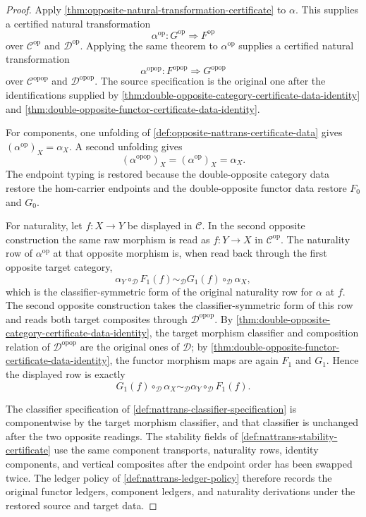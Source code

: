 \begin{proof}
Apply \autoref{thm:opposite-natural-transformation-certificate} to $\alpha$. This supplies a certified natural transformation
$$
\alpha^{\mathrm{op}}:G^{\mathrm{op}}\Rightarrow F^{\mathrm{op}}
$$
over $\mathcal C^{\mathrm{op}}$ and $\mathcal D^{\mathrm{op}}$. Applying the same theorem to $\alpha^{\mathrm{op}}$ supplies a certified natural transformation
$$
\alpha^{\mathrm{opop}}:F^{\mathrm{opop}}\Rightarrow G^{\mathrm{opop}}
$$
over $\mathcal C^{\mathrm{opop}}$ and $\mathcal D^{\mathrm{opop}}$. The source specification is the original one after the identifications supplied by \autoref{thm:double-opposite-category-certificate-data-identity} and \autoref{thm:double-opposite-functor-certificate-data-identity}.

For components, one unfolding of \autoref{def:opposite-nattrans-certificate-data} gives $(\alpha^{\mathrm{op}})_X=\alpha_X$. A second unfolding gives
$$
(\alpha^{\mathrm{opop}})_X=(\alpha^{\mathrm{op}})_X=\alpha_X.
$$
The endpoint typing is restored because the double-opposite category data restore the hom-carrier endpoints and the double-opposite functor data restore $F_0$ and $G_0$.

For naturality, let $f:X\to Y$ be displayed in $\mathcal C$. In the second opposite construction the same raw morphism is read as $f:Y\to X$ in $\mathcal C^{\mathrm{op}}$. The naturality row of $\alpha^{\mathrm{op}}$ at that opposite morphism is, when read back through the first opposite target category,
$$
\alpha_Y\circ_{\mathcal D}F_1(f)
\sim_{\mathcal D}
G_1(f)\circ_{\mathcal D}\alpha_X,
$$
which is the classifier-symmetric form of the original naturality row for $\alpha$ at $f$. The second opposite construction takes the classifier-symmetric form of this row and reads both target composites through $\mathcal D^{\mathrm{opop}}$. By \autoref{thm:double-opposite-category-certificate-data-identity}, the target morphism classifier and composition relation of $\mathcal D^{\mathrm{opop}}$ are the original ones of $\mathcal D$; by \autoref{thm:double-opposite-functor-certificate-data-identity}, the functor morphism maps are again $F_1$ and $G_1$. Hence the displayed row is exactly
$$
G_1(f)\circ_{\mathcal D}\alpha_X
\sim_{\mathcal D}
\alpha_Y\circ_{\mathcal D}F_1(f).
$$

The classifier specification of \autoref{def:nattrans-classifier-specification} is componentwise by the target morphism classifier, and that classifier is unchanged after the two opposite readings. The stability fields of \autoref{def:nattrans-stability-certificate} use the same component transports, naturality rows, identity components, and vertical composites after the endpoint order has been swapped twice. The ledger policy of \autoref{def:nattrans-ledger-policy} therefore records the original functor ledgers, component ledgers, and naturality derivations under the restored source and target data.
\end{proof}

